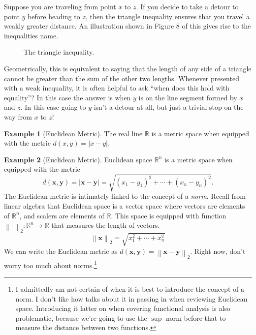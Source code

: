 \documentclass{article}
\newcommand{\R}{\mathbb{R}}
\newcommand{\x}{\mathbf{x}}
\newcommand{\y}{\mathbf{y}}
\newcommand{\norm}[1]{\left\lVert#1\right\rVert}
\theoremstyle{definition}
\newtheorem{example}{Example}[section]
\begin{document}
	Suppose you are traveling from point $ x $ to $ z $. If you decide to take a detour to point $ y $ before heading to $ z $, then the triangle inequality ensures that you travel a weakly greater distance. An illustration shown in Figure 8 of this gives rise to the inequalities name.
	\begin{figure}[h!]
		\centering
		\caption{The triangle inequality.}
	\end{figure}  
	Geometrically, this is equivalent to saying that the length of any side of a triangle cannot be greater than the sum of the other two lengths. Whenever presented with a weak inequality, it is often helpful to ask ``when does this hold with equality''? In this case the answer is when $ y $ is on the line segment formed by $ x $ and $ z $. In this case going to $ y $ isn't a detour at all, but just a trivial stop on the way from $ x $ to $ z $! 
	\begin{example}[Euclidean Metric]
		The real line $ \R $ is a metric space when equipped with the metric $ d(x,y)=|x-y| $. 
	\end{example}
	\begin{example}[Euclidean Metric]
		Euclidean space $ \R^n $ is a metric space when equipped with the metric $$ d(\mathbf{x},\mathbf{y})=|\x-\y|=\sqrt{(x_1-y_1)^2+\cdots+(x_n-y_n)^2} .$$  The Euclidean metric is intimately linked to the concept of a \textit{\color{red}norm}. Recall from linear algebra that Euclidean space is a vector space where vectors are elements of $ \R^n $, and scalers are elements of $ \R $. This space is equipped with function $ \norm{\cdot}_2:\R^n\to\R $ that measures the length of vectors. $$ \norm{\x}_2=\sqrt{x_1^2+\cdots+x_n^2}$$ We can write the Euclidean metric as $ d(\x,\y)=\norm{\x-\y}_2 $. Right now, don't worry too much about norms.\footnote{I admittedly am not certain of when it is best to introduce the concept of a norm. I don't like how \cite{rudin1964principles} talks about it in passing in when reviewing Euclidean space. Introducing it latter on when covering functional analysis is also problematic, because we're going to use the $ \sup $-norm before that to measure the distance between two functions.} 
	\end{example}
\end{document}
